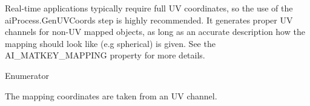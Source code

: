Real-\/time applications typically require full U\+V coordinates, so the use of the {\ttfamily ai\+Process.\+Gen\+U\+V\+Coords} step is highly recommended. It generates proper U\+V channels for non-\/\+U\+V mapped objects, as long as an accurate description how the mapping should look like (e.\+g spherical) is given. See the {\ttfamily A\+I\+\_\+\+M\+A\+T\+K\+E\+Y\+\_\+\+M\+A\+P\+P\+I\+N\+G} property for more details. \begin{Desc}
\item[Enumerator]\par
\begin{description}
\item[{\em 
\hypertarget{namespaceassimp_1_1material_ae0a6af9b6411ae81bf4227ab6b36f679a651a6dc2da0e6c12d6bd569155b6cd6a}{U\+V}\label{namespaceassimp_1_1material_ae0a6af9b6411ae81bf4227ab6b36f679a651a6dc2da0e6c12d6bd569155b6cd6a}
}]The mapping coordinates are taken from an U\+V channel.


\end{description}
\end{Desc}
